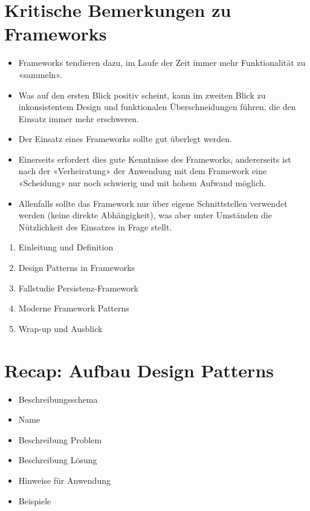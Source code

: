 \section*{Kritische Bemerkungen zu Frameworks}
\begin{itemize}
  \item Frameworks tendieren dazu, im Laufe der Zeit immer mehr Funktionalität zu «sammeln».
  \item Was auf den ersten Blick positiv scheint, kann im zweiten Blick zu inkonsistentem Design und funktionalen Überschneidungen führen, die den Einsatz immer mehr erschweren.
  \item Der Einsatz eines Frameworks sollte gut überlegt werden.
  \item Einerseits erfordert dies gute Kenntnisse des Frameworks, andererseits ist nach der «Verheiratung» der Anwendung mit dem Framework eine «Scheidung» nur noch schwierig und mit hohem Aufwand möglich.
  \item Allenfalls sollte das Framework nur über eigene Schnittstellen verwendet werden (keine direkte Abhängigkeit), was aber unter Umständen die Nützlichkeit des Einsatzes in Frage stellt.
\end{itemize}

\begin{enumerate}
  \item Einleitung und Definition
  \item Design Patterns in Frameworks
  \item Fallstudie Persistenz-Framework
  \item Moderne Framework Patterns
  \item Wrap-up und Ausblick
\end{enumerate}

\section*{Recap: Aufbau Design Patterns}
\begin{itemize}
  \item Beschreibungsschema
  \item Name
  \item Beschreibung Problem
  \item Beschreibung Lösung
  \item Hinweise für Anwendung
  \item Beispiele
\end{itemize}

